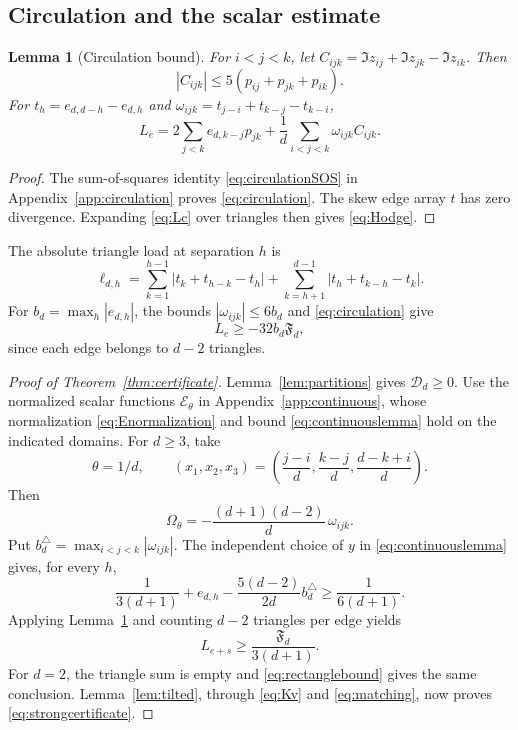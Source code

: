 \documentclass[11pt]{amsart}
\newtheorem{lemma}[theorem]{Lemma}
\theoremstyle{remark}
\theoremstyle{plain}
\numberwithin{equation}{section}
\newcommand{\Fdef}{\mathfrak F_d}
\newcommand{\Ddef}{\mathcal D_d}
\begin{document}
\subsection{Circulation and the scalar estimate}

\begin{lemma}[Circulation bound]\label{lem:circulation}
For \(i<j<k\), let
\(C_{ijk}=\Im z_{ij}+\Im z_{jk}-\Im z_{ik}\).
Then
\begin{equation}\label{eq:circulation}
 |C_{ijk}|\le5(p_{ij}+p_{jk}+p_{ik}).
\end{equation}
For \(t_h=e_{d,d-h}-e_{d,h}\) and
\(\omega_{ijk}=t_{j-i}+t_{k-j}-t_{k-i}\),
\begin{equation}\label{eq:Hodge}
 L_e=2\sum_{j<k}e_{d,k-j}p_{jk}
       +\frac1d\sum_{i<j<k}\omega_{ijk}C_{ijk}.
\end{equation}
\end{lemma}

\begin{proof}
The sum-of-squares identity \eqref{eq:circulationSOS} in
Appendix~\ref{app:circulation} proves \eqref{eq:circulation}.
The skew edge array \(t\) has zero divergence.
Expanding \eqref{eq:Lc} over triangles then gives \eqref{eq:Hodge}.
\end{proof}

The absolute triangle load at separation \(h\) is
\begin{equation}\label{eq:load}
 \ell_{d,h}=
 \sum_{k=1}^{h-1}|t_k+t_{h-k}-t_h|
 +\sum_{k=h+1}^{d-1}|t_h+t_{k-h}-t_k|.
\end{equation}
For \(b_d=\max_h|e_{d,h}|\), the bounds
\(|\omega_{ijk}|\le6b_d\) and \eqref{eq:circulation} give
\begin{equation}\label{eq:coarseerror}
 L_e\ge-32b_d\Fdef,
\end{equation}
since each edge belongs to \(d-2\) triangles.

\begin{proof}[Proof of Theorem~\ref{thm:certificate}]
Lemma~\ref{lem:partitions} gives \(\Ddef\ge0\).
Use the normalized scalar functions \(\mathcal E_\theta\) in
Appendix~\ref{app:continuous}, whose normalization
\eqref{eq:Enormalization} and bound \eqref{eq:continuouslemma}
hold on the indicated domains.
For \(d\ge3\), take
\[
 \theta=1/d,\qquad
 (x_1,x_2,x_3)=
 \left(\frac{j-i}{d},\frac{k-j}{d},\frac{d-k+i}{d}\right).
\]
Then
\[
 \Omega_\theta=-\frac{(d+1)(d-2)}d\,\omega_{ijk}.
\]
Put \(b_d^\triangle=\max_{i<j<k}|\omega_{ijk}|\).
The independent choice of \(y\) in \eqref{eq:continuouslemma} gives,
for every \(h\),
\[
 \frac1{3(d+1)}+e_{d,h}
 -\frac{5(d-2)}{2d}b_d^\triangle
 \ge\frac1{6(d+1)}.
\]
Applying Lemma~\ref{lem:circulation} and counting \(d-2\) triangles
per edge yields
\[
 L_{e+s}\ge\frac{\Fdef}{3(d+1)}.
\]
For \(d=2\), the triangle sum is empty and
\eqref{eq:rectanglebound} gives the same conclusion.
Lemma~\ref{lem:tilted}, through \eqref{eq:Kv} and
\eqref{eq:matching}, now proves \eqref{eq:strongcertificate}.
\end{proof}
\end{document}
